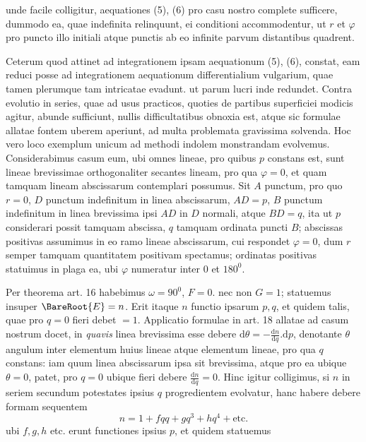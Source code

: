 %
unde facile colligitur, aequationes (5), (6) pro casu nostro complete sufficere, dummodo ea, quae indefinita relinquunt, ei conditioni accommodentur, ut \(r\) et \(\varphi\) pro puncto illo initiali atque punctis ab eo infinite parvum distantibus quadrent.

Ceterum quod attinet ad integrationem ipsam aequationum (5), (6), constat, eam reduci posse ad integrationem aequationum differentialium vulgarium, quae tamen plerumque tam intricatae evadunt. ut parum lucri inde redundet. Contra evolutio in series, quae ad usus practicos, quoties de partibus superficiei modicis agitur, abunde sufficiunt, nullis difficultatibus obnoxia est, atque sic formulae allatae fontem uberem aperiunt, ad multa problemata gravissima solvenda. Hoc vero loco exemplum unicum ad methodi indolem monstrandam evolvemus.
Considerabimus casum eum, ubi omnes lineae, pro quibus \(p\) constans est, sunt lineae brevissimae orthogonaliter secantes lineam, pro qua \(\varphi=0\), et quam tamquam lineam abscissarum contemplari possumus. Sit \(A\) punctum, pro quo \(r=0\), \(D\) punctum indefinitum in linea abscissarum, \(AD=p\), \(B\) punctum indefinitum in linea brevissima ipsi \(AD\) in \(D\) normali, atque \(BD=q\), ita ut \(p\) considerari possit tamquam abscissa, \(q\) tamquam ordinata puncti \(B\); abscissas positivas assumimus in eo ramo lineae abscissarum, cui respondet \(\varphi=0\), dum \(r\) semper tamquam quantitatem positivam spectamus; ordinatas positivas statuimus in plaga ea, ubi \(\varphi\) numeratur inter 0 et \(180^0\).

Per theorema art. 16 habebimus \(\omega=90^0\), \(F=0\). nec non \(G=1\); statuemus insuper \(\BareRoot{E}=n\). Erit itaque \(n\) functio ipsarum \(p,q\), et quidem talis, quae pro \(q=0\) fieri debet \(=1\). Applicatio formulae in art. 18 allatae ad casum nostrum docet, in \textit{quavis} linea brevissima esse debere \(\mathrm{d}\theta=-\frac{\mathrm{d}n}{\mathrm{d}q}\mathord{.}\mathrm{d}p\), denotante \(\theta\) angulum inter elementum huius lineae atque elementum lineae, pro qua \(q\) constans: iam quum linea abscissarum ipsa sit brevissima, atque pro ea ubique \(\theta=0\), patet, pro \(q=0\) ubique fieri debere \(\frac{\mathrm{d}n}{\mathrm{d}q}=0\). Hinc igitur colligimus, si \(n\) in seriem secundum potestates ipsius \(q\) progredientem evolvatur, hanc habere debere formam sequentem
\[
n=1+fqq+gq^3+hq^4+\text{etc.}
\]
ubi \(f,g,h\) etc. erunt functiones ipsius \(p\), et quidem statuemus
